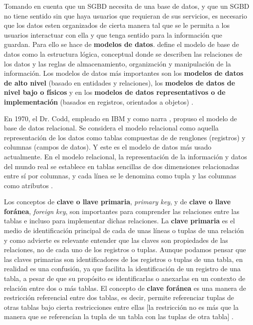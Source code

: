 \documentclass[12pt]{article}
\begin{document}

Tomando en cuenta que un SGBD necesita de una base de datos, y que un SGBD no tiene sentido sin que haya usuarios que requieran de sus servicios, es necesario que los datos esten organizados de cierta manera tal que se le permita a los usuarios interactuar con ella y que tenga sentido para la información que guardan. Para ello se hace de \textbf{modelos de datos}. \textcite{amazon} define el modelo de base de datos como la estructura lógica, conceptual donde se describen las relaciones de los datos y las reglas de almacenamiento, organización y manipulación de la información. Los modelos de datos más importantes son los \textbf{modelos de datos de alto nivel} (basado en entidades y relaciones), los \textbf{modelos de datos de nivel bajo o físicos} y en los \textbf{modelos de datos representativos o de implementación} (basados en registros, orientados a objetos) \parencite{Elmasri2007, Castillo1995}.
\newline

En 1970, el Dr. Codd, empleado en IBM y como narra \textcite{Castillo1995}, propuso el modelo de base de datos relacional. Se considera el modelo relacional como aquella representación de los datos como tablas compuestas de de renglones (registros) y columnas (campos de datos). Y este es el modelo de datos más usado actualmente. En el modelo relacional, la representación de la información y datos del mundo real se establece en tablas sencillas de dos dimensiones relacionadas entre sí por columnas, y cada línea se le denomina como tupla y las columnas como atributos \parencite{Ramirez2009}.
\newline


Los conceptos de \textbf{clave o llave primaria}, \textit{primary key}, y de \textbf{clave o llave foránea}, \textit{foreign key}, son importantes para comprender las relaciones entre las tablas e incluso para implementar dichas relaciones. La \textbf{clave primaria} es el medio de identificación principal de cada de unas líneas o tuplas de una relación y como advierte \textcite{Silberschatz2014} es relevante entender que las claves son propiedades de las relaciones, no de cada uno de los registros o tuplas. Aunque podamos pensar que las claves primarias son identificadores de los registros o tuplas de una tabla, en realidad es una confusión, ya que facilita la identificación de un registro de una tabla, a pesar de que su propósito es identificarlas o anexarlas en un contexto de relación entre dos o más tablas. El concepto de \textbf{clave foránea} es una manera de restricción referencial entre dos tablas, es decir, permite referenciar tuplas de otras tablas bajo cierta restricciones entre ellas [la restricción no es más que la manera que se referencían la tupla de un tabla con las tuplas de otra tabla] \parencite{Elmasri2007}.
\newline
\end{document}
